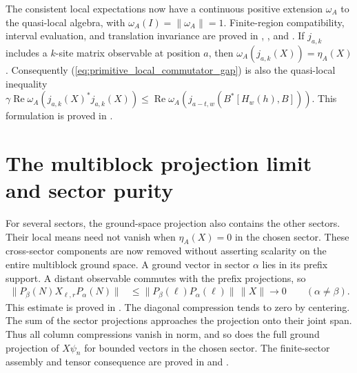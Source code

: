 \documentclass{article}
\begin{document}
The consistent local expectations now have a continuous positive extension
$\omega_A$ to the quasi-local algebra, with $\omega_A(I)=\|\omega_A\|=1$.
Finite-region compatibility, interval evaluation, and translation invariance
are proved in
,
, and
.
If $j_{a,k}$ includes a $k$-site matrix observable at position $a$, then
$\omega_A(j_{a,k}(X))=\eta_A(X)$. Consequently
(\ref{eq:primitive_local_commutator_gap}) is also the quasi-local inequality
$\gamma\operatorname{Re}\omega_A(j_{a,k}(X)^*j_{a,k}(X))
\leq\operatorname{Re}\omega_A(j_{a-t,w}(B^*[H_w(h),B]))$.
This formulation is proved in
.

\newpage
\section{The multiblock projection limit and sector purity}
For several sectors, the ground-space projection also contains the other
sectors. Their local means need not vanish when $\eta_A(X)=0$ in the
chosen sector. These cross-sector components are now removed without
asserting scalarity on the entire multiblock ground space. A ground vector
in sector $\alpha$ lies in its prefix support. A distant observable commutes
with the prefix projections, so
\begin{align}
    \|P_\beta(N)X_{\ell,r}P_\alpha(N)\|
        &\leq\|P_\beta(\ell)P_\alpha(\ell)\|\,\|X\|
          \longrightarrow0 \qquad (\alpha\neq\beta).
    \label{eq:multiblock_prefix_cross_compression}
\end{align}
This estimate is proved in
.
The diagonal compression tends to zero by centering. The sum of the sector
projections approaches the projection onto their joint span. Thus all
column compressions vanish in norm, and so does the full ground projection
of $X\psi_n$ for bounded vectors in the chosen sector. The finite-sector
assembly and tensor consequence are proved in
 and
.
\end{document}
